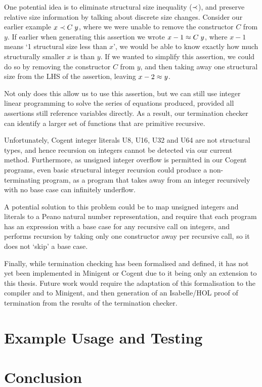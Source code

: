 One potential idea is to eliminate structural size inequality ($\prec$), and preserve relative
size information by talking about discrete size changes. Consider our earlier example $x \prec C\; y$,
where we were unable to remove the constructor $C$ from $y$. 
If earlier when generating this assertion we wrote  $x - 1 \approx C\; y$,
where $x - 1$ means `1 structural size less than $x$', we would be able to know exactly
how much structurally smaller $x$ is than $y$. If we wanted to simplify this assertion,
we could do so by removing the constructor $C$ from $y$, and then taking away one structural size from
the LHS of the assertion, leaving $x - 2 \approx y$.

Not only does this allow us to use this assertion, but we can still use integer linear programming to
solve the series of equations produced, provided all assertions still reference variables directly.
As a result, our termination checker can identify a larger set of functions that are primitive recursive.

Unfortunately, Cogent integer literals \textsc{U8}, \textsc{U16}, \textsc{U32} and
\textsf{U64} are not structural types, and hence recursion on integers
cannot be detected via our current method. Furthermore, as unsigned integer
overflow is permitted in our Cogent programs, even basic structural integer
recursion could produce a non-terminating program, as a program that takes
away from an integer recursively with no base case can infinitely underflow.

A potential solution to this problem could be to map unsigned integers
and literals to a Peano natural number representation, and require that
each program has an expression with a base case for any recursive call
on integers, and performs recursion by taking only one constructor
away per recursive call, so it does not `skip' a base case.

Finally, while termination checking has been formalised and defined,
it has not yet been implemented in Minigent or Cogent due to it being
only an extension to this thesis. Future work would require the adaptation
of this formalisation to the compiler and to Minigent, and then
generation of an Isabelle/HOL proof of termination from the results
of the termination checker.

\section{Example Usage and Testing}
\label{ch:examplesandtesting}


\section{Conclusion}


